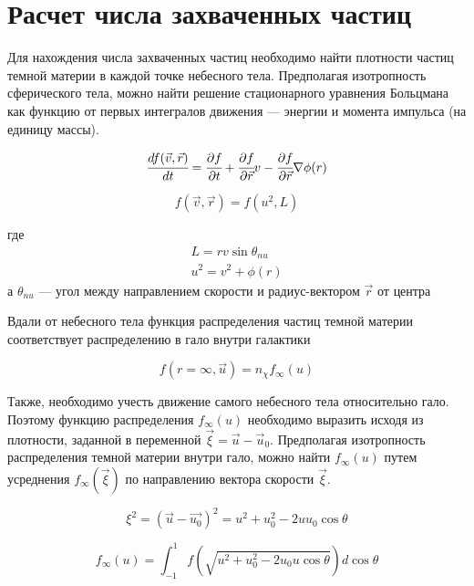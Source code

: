 \section{Расчет числа захваченных частиц}

Для нахождения числа захваченных частиц необходимо найти плотности частиц
темной материи в каждой точке небесного тела. Предполагая изотропность 
сферического тела, можно найти решение стационарного уравнения Больцмана как функцию от первых интегралов движения --- энергии и момента импульса (на единицу массы).

\begin{equation}
	\label{boltsman_capt}
	\cfrac{d f(\vec{v},\vec{r})}{d t} = \cfrac{\partial f}{\partial t}+
	\cfrac{\partial f}{\partial \vec{r}}v - \cfrac{\partial f}{\partial \vec{r}}\nabla\phi(r)
\end{equation}


\begin{equation}
	f(\vec{v},\vec{r}) = f(u^2,L)
\end{equation}

где 
\begin{eqnarray}
	L = rv \sin {\theta_{nu}}\\
	u^2 = v^2 + \phi(r)
\end{eqnarray}
а $\theta_{nu}$ --- угол между направлением скорости и радиус-вектором $\vec{r}$ от центра 

Вдали от небесного тела функция распределения частиц темной материи соответствует распределению в гало внутри галактики 

\begin{equation}
	f(r=\infty,\vec{u}) = n_{\chi}f_{\infty}(u)
\end{equation}



Также, необходимо учесть движение самого небесного тела относительно гало. Поэтому функцию распределения $f_{\infty}(u)$ необходимо выразить исходя из плотности,
заданной в переменной $\vec{\xi} = \vec{u} - \vec{u}_0$. 
Предполагая изотропность распределения темной материи внутри гало, можно найти $f_{\infty}(u)$
путем усреднения $f_{\infty}(\vec{\xi})$ по направлению вектора скорости $\vec{\xi}$.

\begin{equation}
	\xi^2 = (\vec{u} - \vec{u_0})^2 = u^2 + u_0^2 - 2 u u_0 \cos{\theta}
\end{equation}

\begin{equation}
	f_{\infty}(u) =
	 \int_{-1}^{1} f\left(\sqrt{u^2+u_0^2-2u_0 u \cos{\theta}}\right)
	 d \cos{\theta}
\end{equation}

